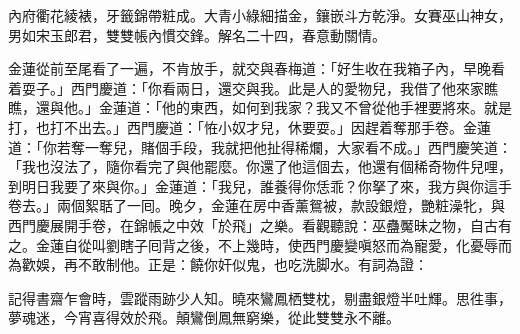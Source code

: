 \begin{myquote}
內府衢花綾裱，牙籤錦帶粧成。大青小綠細描金，鑲嵌斗方乾淨。女賽巫山神女，男如宋玉郎君，雙雙帳內慣交鋒。解名二十四，春意動關情。
\end{myquote}

金蓮從前至尾看了一遍，不肯放手，就交與春梅道：「好生收在我箱子內，早晚看着耍子。」{}西門慶道：「你看兩日，還交與我。此是人的愛物兒，我借了他來家瞧瞧，還與他。」金蓮道：「他的東西，如何到我家？我又不曾從他手裡要將來。就是打，也打不出去。」{}西門慶道：「恠小奴才兒，休要耍。」因趕着奪那手卷。金蓮道：「你若奪一奪兒，賭個手段，我就把他扯得稀爛，大家看不成。」{}西門慶笑道：「我也沒法了，隨你看完了與他罷麼。你還了他這個去，他還有個稀奇物件兒哩，到明日我要了來與你。」金蓮道：「我兒，誰養得你恁乖？{}你拏了來，我方與你這手卷去。」兩個絮聒了一囘。晚夕，金蓮在房中香薰鴛被，款設銀燈，艷粧澡牝，與西門慶展開手卷，在錦帳之中效「於飛」之樂。{}看觀聽說：巫蠱魘昧之物，自古有之。金蓮自從叫劉瞎子囘背之後，不上幾時，使西門慶變嗔怒而為寵愛，化憂辱而為歡娛，再不敢制他。正是：饒你奸似鬼，也吃洗脚水。有詞為證：

\begin{myquote}
記得書齋乍會時，雲蹤雨跡少人知。曉來鸞鳳栖雙枕，剔盡銀燈半吐輝。思徃事，夢魂迷，今宵喜得效於飛。顛鸞倒鳳無窮樂，從此雙雙永不離。
\end{myquote}

 

